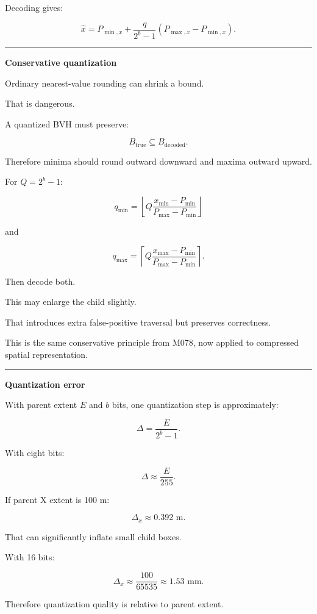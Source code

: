 Decoding gives:

\[
\hat x=
P_{\min,x}
+
\frac{q}{2^b-1}
(P_{\max,x}-P_{\min,x}).
\]

\begin{center}\rule{0.5\linewidth}{0.5pt}\end{center}

\textbf{Conservative quantization}

Ordinary nearest-value rounding can shrink a bound.

That is dangerous.

A quantized BVH must preserve:

\[
B_{\text{true}}\subseteq B_{\text{decoded}}.
\]

Therefore minima should round outward downward and maxima outward upward.

For \(Q=2^b-1\):

\[
q_{\min}
=
\left\lfloor
Q
\frac{x_{\min}-P_{\min}}
{P_{\max}-P_{\min}}
\right\rfloor
\]

and

\[
q_{\max}
=
\left\lceil
Q
\frac{x_{\max}-P_{\min}}
{P_{\max}-P_{\min}}
\right\rceil.
\]

Then decode both.

This may enlarge the child slightly.

That introduces extra false-positive traversal but preserves correctness.

This is the same conservative principle from M078, now applied to compressed spatial representation.

\begin{center}\rule{0.5\linewidth}{0.5pt}\end{center}

\textbf{Quantization error}

With parent extent \(E\) and \(b\) bits, one quantization step is approximately:

\[
\Delta=
\frac{E}{2^b-1}.
\]

With eight bits:

\[
\Delta\approx \frac{E}{255}.
\]

If parent X extent is 100 m:

\[
\Delta_x\approx0.392\text{ m}.
\]

That can significantly inflate small child boxes.

With 16 bits:

\[
\Delta_x\approx
\frac{100}{65535}
\approx1.53\text{ mm}.
\]

Therefore quantization quality is relative to parent extent.

